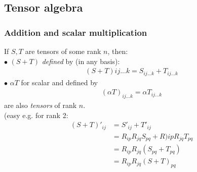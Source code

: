 \documentclass[a4paper]{article}
\begin{document}
\subsection{Tensor algebra}
\subsubsection{Addition and scalar multiplication}
If $S,T$ are tensors of some rank $n$, then:\\
$\bullet$ $\left(S+T\right)$ \emph{defined} by (in any basis):
\begin{equation*}
\begin{aligned}
\left(S+T\right){ij...k} = S_{ij...k} + T_{ij...k}
\end{aligned}
\end{equation*}
$\bullet$ $\alpha T$ for scalar and defined by
\begin{equation*}
\begin{aligned}
\left(\alpha T\right)_{ij...k} = \alpha T_{ij...k}
\end{aligned}
\end{equation*}
are also \emph{tensors} of rank $n$.\\
(easy e.g. for rank 2:\\
\begin{equation*}
\begin{aligned}
\left(S+T\right)'_{ij} &= S'_{ij} + T'_{ij}\\
&= R_{ip} R_{jq} S_{pq} + R){ip} R_{jq} T_{pq}\\
&= R_{ip} R_{jq} \left(S_{pq} + T_{pq}\right)\\
&= R_{ip} R_{jq} \left(S+T\right)_{pq}
\end{aligned}
\end{equation*}
\end{document}
